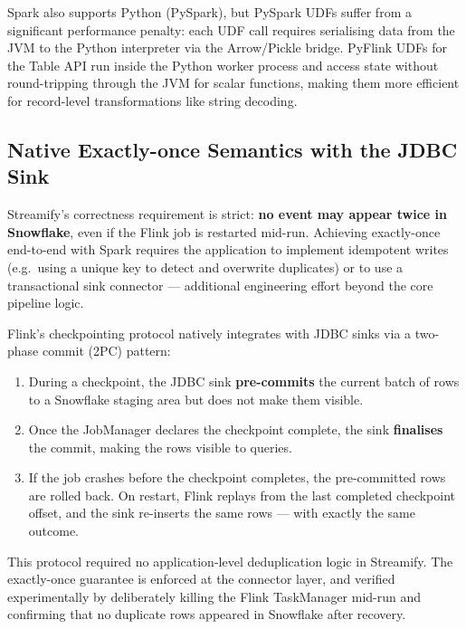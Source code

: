 Spark also supports Python (PySpark), but PySpark UDFs suffer from a significant performance
penalty: each UDF call requires serialising data from the JVM to the Python interpreter via
the Arrow/Pickle bridge.
PyFlink UDFs for the Table API run inside the Python worker process and access state without
round-tripping through the JVM for scalar functions, making them more efficient for
record-level transformations like string decoding.

\subsection{Native Exactly-once Semantics with the JDBC Sink}

Streamify's correctness requirement is strict: \textbf{no event may appear twice in Snowflake},
even if the Flink job is restarted mid-run.
Achieving exactly-once end-to-end with Spark requires the application to implement idempotent
writes (e.g.\ using a unique key to detect and overwrite duplicates) or to use a transactional
sink connector — additional engineering effort beyond the core pipeline logic.

Flink's checkpointing protocol natively integrates with JDBC sinks via a two-phase commit (2PC)
pattern:
\begin{enumerate}
  \item During a checkpoint, the JDBC sink \textbf{pre-commits} the current batch of rows to a
        Snowflake staging area but does not make them visible.
  \item Once the JobManager declares the checkpoint complete, the sink \textbf{finalises} the
        commit, making the rows visible to queries.
  \item If the job crashes before the checkpoint completes, the pre-committed rows are rolled back.
        On restart, Flink replays from the last completed checkpoint offset, and the sink
        re-inserts the same rows — with exactly the same outcome.
\end{enumerate}

This protocol required no application-level deduplication logic in Streamify.
The exactly-once guarantee is enforced at the connector layer, and verified experimentally by
deliberately killing the Flink TaskManager mid-run and confirming that no duplicate rows
appeared in Snowflake after recovery.
